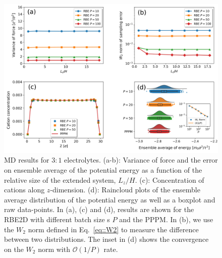 \begin{figure}[!ht]
	\centering
\includegraphics[width=0.90\linewidth]{figs/3_1Elec.pdf}
	\caption{MD results for $3:1$ electrolytes. (a-b):  Variance of force and the error on ensemble average of the potential energy as a function of the relative size of the extended system, $L_z/H$. (c):  Concentration of cations along $z$-dimension. (d):  Raincloud plots of the ensemble average distribution of the potential energy as well as a boxplot and raw data-points. In (a), (c) and (d), results are shown for the RBE2D with different batch size {s} $P$ and the PPPM. In (b), we use the $W_2$ norm defined in Eq.~\eqref{eq::W2} to measure the difference between two distributions. The inset in (d) shows the convergence on the $W_2$ norm with $\mathcal{O}(1/P)$ rate.}
	\label{fig:3_1}
\end{figure}

